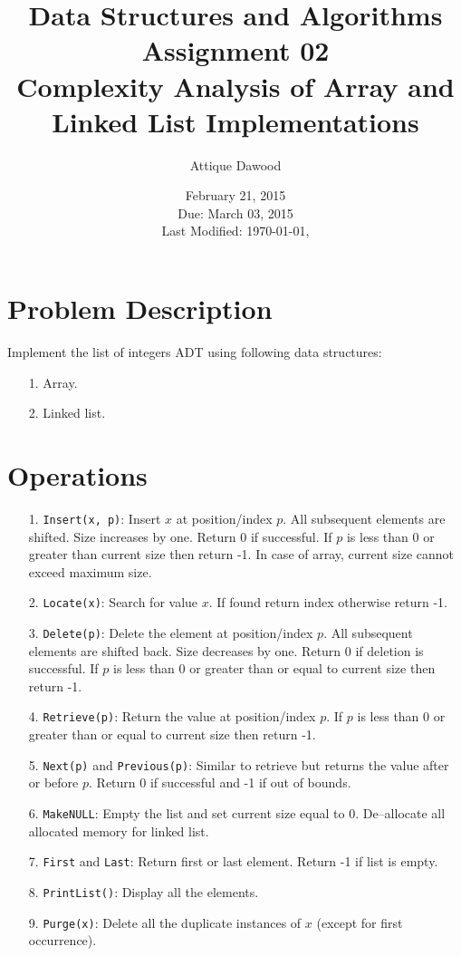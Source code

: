 \documentclass[12pt,a4paper]{article}
\title{Data Structures and Algorithms\\Assignment 02\\Complexity Analysis of Array and Linked List Implementations}
\author{Attique Dawood}
\date{February 21, 2015\\Due: March 03, 2015\\[0.2cm] Last Modified: \today, \currenttime}
\begin{document}
\maketitle
\section{Problem Description}
Implement the list of integers ADT using following data structures:
\begin{itemize}
\item[1.] Array.
\item[2.] Linked list.
\end{itemize}
\section{Operations}
\begin{itemize}
\item[1.] \verb|Insert(x, p)|: Insert $x$ at position/index $p$. All subsequent elements are shifted. Size increases by one. Return 0 if successful. If $p$ is less than 0 or greater than current size then return -1. In case of array, current size cannot exceed maximum size.
\item[2.] \verb|Locate(x)|: Search for value $x$. If found return index otherwise return -1.
\item[3.] \verb|Delete(p)|: Delete the element at position/index $p$. All subsequent elements are shifted back. Size decreases by one. Return 0 if deletion is successful. If $p$ is less than 0 or greater than or equal to current size then return -1.
\item[4.] \verb|Retrieve(p)|: Return the value at position/index $p$. If $p$ is less than 0 or greater than or equal to current size then return -1.
\item[5.] \verb|Next(p)| and \verb|Previous(p)|: Similar to retrieve but returns the value after or before $p$. Return 0 if successful and -1 if out of bounds.
\item[6.] \verb|MakeNULL|: Empty the list and set current size equal to 0. De--allocate all allocated memory for linked list.
\item[7.] \verb|First| and \verb|Last|: Return first or last element. Return -1 if list is empty.
\item[8.] \verb|PrintList()|: Display all the elements.
\item[9.] \verb|Purge(x)|: Delete all the duplicate instances of $x$ (except for first occurrence).
\end{itemize}
\end{document}
